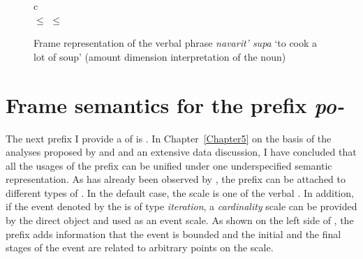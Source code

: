 \begin{figure}
\begin{tabular}{c}
\\
 $\leq$  $\leq$ 
\end{tabular}
\caption{Frame representation of the verbal phrase \textit{navarit' supa} `to cook a lot of soup' (amount dimension interpretation of the noun) \label{frame:navarit:soup:amount}}
\end{figure}


\section{Frame semantics for the prefix \textit{po-}}\label{section:frame:po}
The next prefix I provide a  of is . In Chapter~\ref{Chapter5} on the basis of the analyses proposed by \citet{Filip:00} and \citealt{Kagan:book} and an extensive data discussion, I have concluded that all the usages of the prefix  can be unified under one underspecified semantic representation. As has already been observed by \citet{Kagan:book}, the prefix  can be attached to different types of . In the default case, the scale is one of the verbal . In addition, if the event denoted by the  is of type \textit{iteration}, a \textit{cardinality} scale can be provided by the direct object and used as an event scale. As shown on the left side of , the prefix adds information that the event is bounded and the initial and the final stages of the event are related to arbitrary points on the scale.

